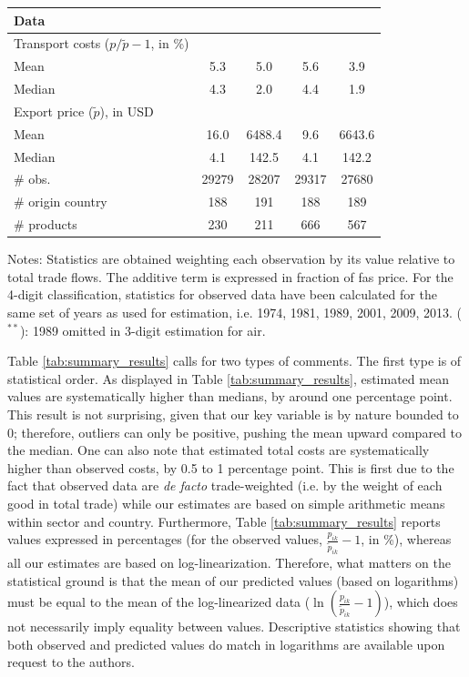 \documentclass[a4paper,11pt]{article}
\begin{document}
\begin{table}[htbp]
{\begin{center}
\begin{tabular}{l|cc|cc}
    \multicolumn{5}{l}{\textbf{Data}  } \\ \hline
    Transport costs ($p/\widetilde{p} -1$, in \%) & & & & \\ \hline
    Mean & 5.3 & 5.0& 5.6&3.9 \\
    Median & 4.3 & 2.0 & 4.4& 1.9 \\ \hline
    Export price ($\widetilde{p}$), in USD & & & & \\
    Mean & 16.0 &	6488.4	&9.6	&6643.6 \\
    Median & 4.1	& 142.5	& 4.1	& 142.2 \\ \hline
    \# obs.
& 29279 & 28207 & 29317 & 27680 \\
    \# origin country & 188 & 191 & 188 & 189 \\
    \# products & 230 & 211 & 666 & 567 \\  \hline \hline
  \end{tabular}
    \end{center}}
\parbox[l]{12cm}{\footnotesize{Notes: Statistics are obtained weighting each observation by its value relative to total trade flows.
The additive term is expressed in fraction of fas price.
For the  4-digit classification, statistics for observed data have been calculated for the same set of years as used for estimation, i.e.
1974, 1981, 1989, 2001, 2009, 2013.
($^{\ast \ast}$): 1989 omitted in 3-digit estimation for air.}}
\end{table}%

Table \ref{tab:summary_results} calls for two types of comments.
The first type is of statistical order.
As displayed in Table \ref{tab:summary_results}, estimated mean values are systematically higher than medians, by around one percentage point.
This result is not surprising, given that our key variable is by nature bounded to 0; therefore, outliers can only be positive, pushing the mean upward compared to the median.
One can also note that estimated total costs are systematically higher than observed costs, by 0.5 to 1 percentage point.
This is first due to the fact that observed data are \textit{de facto} trade-weighted (i.e. by the weight of each good in total trade) while our estimates are based on simple arithmetic means within sector and country.
Furthermore, Table \ref{tab:summary_results} reports values expressed in percentages (for the observed values, $\frac{p_{ik}}{\widetilde{p}_{ik}} -1$, in \%), whereas all our estimates are based on log-linearization.
Therefore, what matters on the statistical ground is that the mean of our predicted values (based on logarithms) must be equal to the mean of the log-linearized data ($\ln\left(\frac{p_{ik}}{\widetilde{p}_{ik}}-1 \right)$), which does not necessarily imply equality between values.
Descriptive statistics showing that both observed and predicted values do match in logarithms are available upon request to the authors.%
\end{document}

